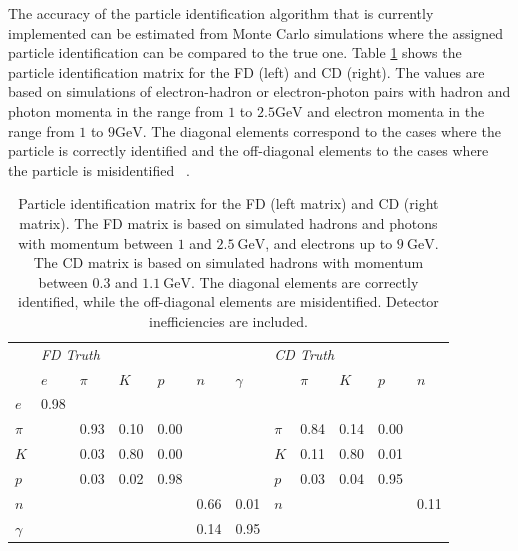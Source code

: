     The accuracy of the particle identification algorithm that is currently implemented can be estimated from Monte Carlo simulations where the assigned particle identification can be compared to the true one.
    Table \ref{tab::rpid} shows the particle identification matrix for the FD (left) and CD (right).
    The values are based on simulations of electron-hadron or electron-photon pairs with hadron and photon momenta in the range from $1$ to $2.5 \text{GeV}$ and electron momenta in the range from $1$ to $9 \text{GeV}$.
    The diagonal elements correspond to the cases where the particle is correctly identified and the off-diagonal elements to the cases where the particle is misidentified ~\cite{ziegler2020}.

    \begin{table}
        \caption{Particle identification matrix for the FD (left matrix) and CD (right matrix).
        The FD matrix is based on simulated hadrons and photons with momentum between $1$ and $2.5~\text{GeV}$, and electrons up to $9~\text{GeV}$.
        The CD matrix is based on simulated hadrons with momentum between $0.3$ and $1.1~\text{GeV}$.
        The diagonal elements are correctly identified, while the off-diagonal elements are misidentified.
        Detector inefficiencies are included.}

        \begin{tabularx}{\textwidth}{XXXXXXX|XXXXX}
            \hline
                     & \multicolumn{6}{l}{\textit{FD Truth}} & \multicolumn{5}{l}{\textit{CD Truth}}  \\
            \cline{2-12}
                     & $e$      & $\pi$ & $K$  & $p$  & $n$  & $\gamma$ &       & $\pi$    & $K$  & $p$  & $n$  \\
            \hline
            $e$      & 0.98     &       &      &      &      &          &       &          &      &      &      \\
            $\pi$    &          & 0.93  & 0.10 & 0.00 &      &          & $\pi$ & 0.84     & 0.14 & 0.00 &      \\
            $K$      &          & 0.03  & 0.80 & 0.00 &      &          & $K$   & 0.11     & 0.80 & 0.01 &      \\
            $p$      &          & 0.03  & 0.02 & 0.98 &      &          & $p$   & 0.03     & 0.04 & 0.95 &      \\
            $n$      &          &       &      &      & 0.66 & 0.01     & $n$   &          &      &      & 0.11 \\
            $\gamma$ &          &       &      &      & 0.14 & 0.95     &       &          &      &      &      \\
            \hline
        \end{tabularx}
        \label{tab::rpid}
    \end{table}
